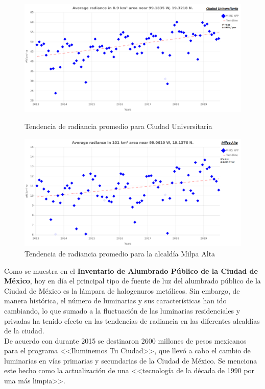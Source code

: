 \newpage


\begin{figure}[H]
  \centering
    \includegraphics[width=1\textwidth]{CU}
  \caption{Tendencia de radiancia promedio para Ciudad Universitaria}
  \label{radiancetrendscu}
\vspace{20mm} 
    \includegraphics[width=1\textwidth]{MA}
  \caption{Tendencia de radiancia promedio para la alcaldía Milpa Alta}
  \label{radiancetrendsma}
\end{figure}
\blindtext

\newpage

Como se muestra en el \textbf{Inventario de Alumbrado Público de la Ciudad de México}, hoy en día el principal tipo de fuente de luz del alumbrado público de la Ciudad de México es la lámpara de halogenuros metálicos. Sin embargo, de manera histórica, el número de luminarias y sus características han ido cambiando, lo que sumado a la fluctuación de  las luminarias residenciales y privadas ha tenido efecto en las tendencias de radiancia en las diferentes alcaldías de la ciudad.\\

De acuerdo con \cite{Universal2017} durante 2015 se destinaron 2600 millones de pesos mexicanos para el programa <<Iluminemos Tu Ciudad>>, que llevó a cabo el cambio de luminarias en vías primarias y secundarias de la Ciudad de México. Se menciona este hecho como la actualización de una <<tecnología de la década de 1990 por una más limpia>>.\\

